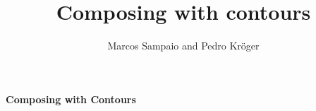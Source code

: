 \documentclass[12pt]{article}
\begin{document}
\title{Composing with contours}
\author{Marcos Sampaio and Pedro Kröger}

\begin{center}
  \Large \textbf{\textsf{Composing with Contours}}
\end{center}


\thispagestyle{empty}

\doublespacing


\singlespacing



\end{document}
